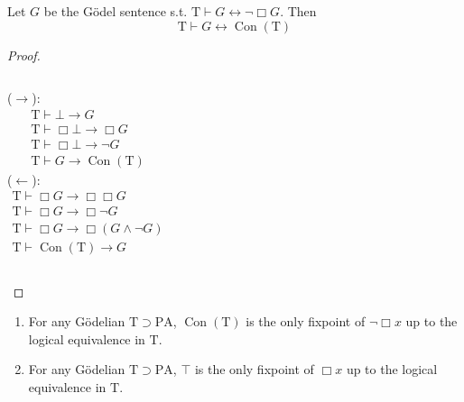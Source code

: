 \documentclass[UTF8,11pt,colorlinks,compress,openany]{beamer}%
\begin{document}
\begin{frame}\frametitle{}
\setlength\abovedisplayskip{0pt}
\setlength\belowdisplayskip{0pt}
	\begin{block}{}
		Let $G$ be the G\"odel sentence s.t. $\mathrm{T}\vdash G\leftrightarrow\neg\Box G$. Then
		\[\mathrm{T}\vdash G\leftrightarrow\operatorname{Con}(\mathrm{T})\]
	\end{block}
	\begin{proof}
		\begin{columns}
			($\to$): 
			\begin{gather*}
				\mathrm{T}\vdash\bot\to G\\
				\mathrm{T}\vdash\Box \bot\to\Box G\\
				\mathrm{T}\vdash\Box \bot\to\neg G\\
				\mathrm{T}\vdash G\to\operatorname{Con}(\mathrm{T})
			\end{gather*}
			($\leftarrow$): 
			\begin{gather*}
				\mathrm{T}\vdash\Box G\to\Box \Box G\\
				\mathrm{T}\vdash\Box G\to\Box \neg G\\
				\mathrm{T}\vdash\Box G\to\Box (G\wedge\neg G)\\
				\mathrm{T}\vdash\operatorname{Con}(\mathrm{T})\to G
			\end{gather*}
		\end{columns}
	\end{proof}
	\begin{block}{\hyperlink{provability-logic}{}}\label{fixpoint-uniqueness}
		\begin{enumerate}
			\item For any G\"odelian $\mathrm{T}\supset \mathrm{PA} $, $\operatorname{Con}(\mathrm{T})$ is the only fixpoint of $\neg\Box x$ up to the logical equivalence in $\mathrm{T}$.
			\item For any G\"odelian $\mathrm{T}\supset\mathrm{PA} $, $\top$ is the only fixpoint of $\Box x$ up to the logical equivalence in $\mathrm{T}$.
		\end{enumerate}
	\end{block}
\end{frame}
\end{document}
